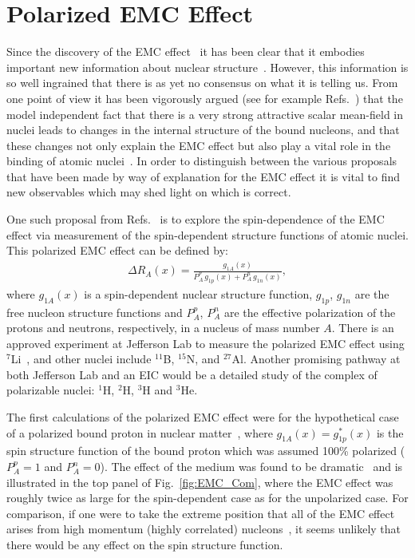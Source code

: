 \section{Polarized EMC Effect\label{sec:pemc}}
%
Since the discovery of the EMC effect~\cite{Aubert:1983xm,Bodek:1983ec} it has been clear that it embodies important new information about nuclear structure~\cite{Geesaman:1995yd}. However, this information is so well ingrained that there is as yet no consensus on what it is telling us. From one point of view it has been vigorously argued (see for example Refs.~\cite{Thomas:2016bxx,Guichon:2018uew}) that the model independent fact that there is a very strong attractive scalar mean-field in nuclei leads to changes in the internal structure of the bound nucleons, and that these changes not only explain the EMC effect but also play a vital role in the binding of atomic nuclei~\cite{Stone:2017oqt,Stone:2016qmi}. In order to distinguish between the various proposals that have been made by way of explanation for the EMC effect it is vital to find new observables which may shed light on which is correct.

One such proposal from Refs.~\cite{Cloet:2005rt,Cloet:2006bq} is to explore the spin-dependence of the EMC effect via measurement of the spin-dependent structure functions of atomic nuclei. This polarized EMC effect can be defined by:
%
\begin{align}
\Delta R_A(x) = \frac{g_{1A}(x)}{P_A^p\,g_{1p}(x) + P_A^n\,g_{1n}(x)},
\label{eq:pemc}
\end{align}
%
where $g_{1A}(x)$ is a spin-dependent nuclear structure function, $g_{1p}$, $g_{1n}$ are the free nucleon structure functions and $P_A^p$, $P_A^n$ are the effective polarization of the protons and neutrons, respectively, in a nucleus of mass number $A$. There is an approved experiment at Jefferson Lab to measure the polarized EMC effect using $^7$Li~\cite{jlabspin}, and other nuclei include $^{11}$B, $^{15}$N, and $^{27}$Al. Another promising pathway at both Jefferson Lab and an EIC would be a detailed study of the complex of polarizable nuclei: $^1$H, $^2$H, $^3$H and $^3$He.

The first calculations of the polarized EMC effect were for the hypothetical case of a polarized bound proton in nuclear matter~\cite{Cloet:2005rt}, where $g_{1A}(x) = g_{1p}^*(x)$ is the spin structure function of the bound proton which was assumed 100\% polarized ($P_A^p=1$ and $P_A^n = 0$). The effect of the medium was found to be dramatic~\cite{Cloet:2005rt} and is illustrated in the top panel of Fig.~\ref{fig:EMC_Com}, where the EMC effect was roughly twice as large for the spin-dependent case as for the unpolarized case.  For comparison, if one were to take the extreme position that all of the EMC effect arises from high momentum (highly correlated) nucleons~\cite{Weinstein:2010rt}, it seems unlikely that there would be any effect on the spin structure function.


